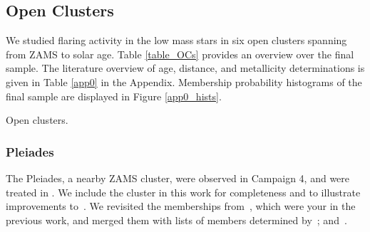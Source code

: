 \documentclass{aa}
\begin{document}
\subsection{Open Clusters}
We studied flaring activity in the low mass stars in six open clusters spanning from ZAMS to solar age. Table \ref{table_OCs} provides an overview over the final sample. The literature overview of age, distance, and metallicity determinations is given in Table \ref{app0} in the Appendix. Membership probability histograms of the final sample are displayed in Figure \ref{app0_hists}.
\begin{table}
\caption{Open clusters.}
\label{table_OCs}
\centering

\end{table}
\subsubsection{Pleiades}
The Pleiades, a nearby ZAMS cluster, were observed in Campaign 4, and were treated in . We include the cluster in this work for completeness and to illustrate improvements to~. We revisited the memberships from~\citet{rebull_rotation_2016}, which were your in the previous work, and merged them with lists of members determined by~\citet{olivares_pleiades_2018, gaia_dr2_2018_hrd}; and~\citet{cantat_gaudin_2018}.
\end{document}
